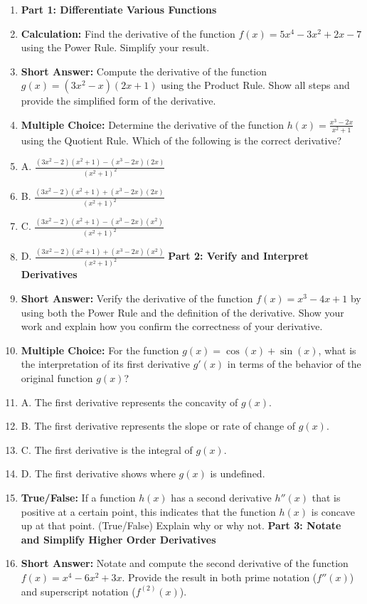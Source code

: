 {{{\begin{enumerate}
    \item \textbf{Part 1: Differentiate Various Functions}
    \item \textbf{Calculation:} Find the derivative of the function $f(x) = 5x^4 - 3x^2 + 2x - 7$ using the Power Rule. Simplify your result.
    \item \textbf{Short Answer:} Compute the derivative of the function $g(x) = (3x^2 - x)(2x + 1)$ using the Product Rule. Show all steps and provide the simplified form of the derivative.
    \item \textbf{Multiple Choice:} Determine the derivative of the function $h(x) = \frac{x^3 - 2x}{x^2 + 1}$ using the Quotient Rule. Which of the following is the correct derivative?
    \item A. $\frac{(3x^2 - 2)(x^2 + 1) - (x^3 - 2x)(2x)}{(x^2 + 1)^2}$
    \item B. $\frac{(3x^2 - 2)(x^2 + 1) + (x^3 - 2x)(2x)}{(x^2 + 1)^2}$
    \item C. $\frac{(3x^2 - 2)(x^2 + 1) - (x^3 - 2x)(x^2)}{(x^2 + 1)^2}$
    \item D. $\frac{(3x^2 - 2)(x^2 + 1) + (x^3 - 2x)(x^2)}{(x^2 + 1)^2}$ \textbf{Part 2: Verify and Interpret Derivatives}
    \item \textbf{Short Answer:} Verify the derivative of the function $f(x) = x^3 - 4x + 1$ by using both the Power Rule and the definition of the derivative. Show your work and explain how you confirm the correctness of your derivative.
    \item \textbf{Multiple Choice:} For the function $g(x) = \cos(x) + \sin(x)$, what is the interpretation of its first derivative $g'(x)$ in terms of the behavior of the original function $g(x)$?
    \item A. The first derivative represents the concavity of $g(x)$.
    \item B. The first derivative represents the slope or rate of change of $g(x)$.
    \item C. The first derivative is the integral of $g(x)$.
    \item D. The first derivative shows where $g(x)$ is undefined.
    \item \textbf{True/False:} If a function $h(x)$ has a second derivative $h''(x)$ that is positive at a certain point, this indicates that the function $h(x)$ is concave up at that point. (True/False) Explain why or why not. \textbf{Part 3: Notate and Simplify Higher Order Derivatives}
    \item \textbf{Short Answer:} Notate and compute the second derivative of the function $f(x) = x^4 - 6x^2 + 3x$. Provide the result in both prime notation ($f''(x)$) and superscript notation ($f^{(2)}(x)$).

\end{enumerate}}}}
